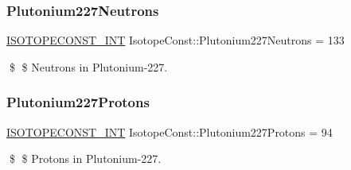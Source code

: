 \subsubsection{\texorpdfstring{Plutonium227\+Neutrons}{Plutonium227Neutrons}}
{\footnotesize\ttfamily \mbox{\hyperlink{group___isotope_const-_macros_ga5f18360b3e99483a35c32d789e62621c}{I\+S\+O\+T\+O\+P\+E\+C\+O\+N\+S\+T\+\_\+\+I\+NT}} Isotope\+Const\+::\+Plutonium227\+Neutrons = 133}

\$ \$ Neutrons in Plutonium-\/227. \mbox{\label{group___isotope_const-_plutonium-_pu227_ga15ee5960ec95930c79aac9730a3cde9e}} 
\subsubsection{\texorpdfstring{Plutonium227\+Protons}{Plutonium227Protons}}
{\footnotesize\ttfamily \mbox{\hyperlink{group___isotope_const-_macros_ga5f18360b3e99483a35c32d789e62621c}{I\+S\+O\+T\+O\+P\+E\+C\+O\+N\+S\+T\+\_\+\+I\+NT}} Isotope\+Const\+::\+Plutonium227\+Protons = 94}

\$ \$ Protons in Plutonium-\/227. 
